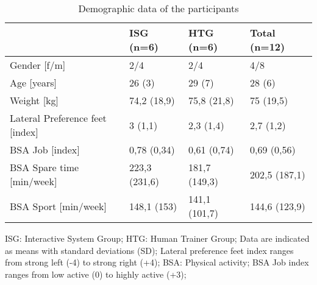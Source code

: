 \begin{table}[]
\centering
  \begin{threeparttable}
\caption{Demographic data of the participants}
\label{tableDemographic}
\begin{tabular}{@{}llll@{}}
\toprule
                                & ISG (n=6)     & HTG (n=6)     & Total (n=12)  \\ \midrule
Gender [f/m]                    & 2/4           & 2/4           & 4/8           \\
Age [years]                     & 26 (3)        & 29 (7)        & 28 (6)        \\
Weight [kg]                     & 74,2 (18,9)   & 75,8 (21,8)   & 75 (19,5)     \\
Lateral Preference feet [index] & 3 (1,1)       & 2,3 (1,4)     & 2,7 (1,2)     \\
BSA Job [index]                 & 0,78 (0,34)   & 0,61 (0,74)   & 0,69 (0,56)   \\
BSA Spare time [min/week]       & 223,3 (231,6) & 181,7 (149,3) & 202,5 (187,1) \\
BSA Sport [min/week]            & 148,1 (153)   & 141,1 (101,7) & 144,6 (123,9) \\ \bottomrule
\end{tabular}
    \begin{tablenotes}
      \small
      \item ISG: Interactive System Group; HTG: Human Trainer Group; Data are indicated as means with standard deviations (SD); Lateral preference feet index ranges from strong left (-4) to strong right (+4); BSA: Physical activity; BSA Job index ranges from low active (0) to highly active (+3);
    \end{tablenotes}
  \end{threeparttable}
\end{table}

